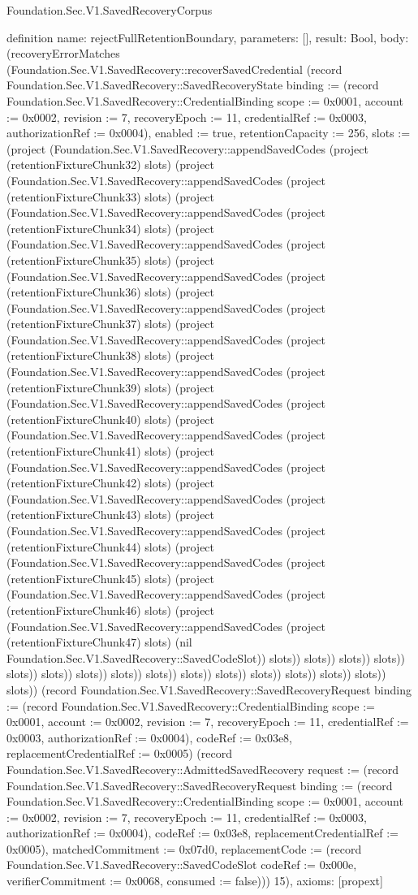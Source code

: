 \begin{lexlean}{Foundation.Sec.V1.SavedRecoveryCorpus}
\begin{semanticmodule}
definition{
  name: rejectFullRetentionBoundary,
  parameters: [],
  result: Bool,
  body: (recoveryErrorMatches (Foundation.Sec.V1.SavedRecovery::recoverSavedCredential (record Foundation.Sec.V1.SavedRecovery::SavedRecoveryState {binding := (record Foundation.Sec.V1.SavedRecovery::CredentialBinding {scope := 0x0001, account := 0x0002, revision := 7, recoveryEpoch := 11, credentialRef := 0x0003, authorizationRef := 0x0004}), enabled := true, retentionCapacity := 256, slots := (project (Foundation.Sec.V1.SavedRecovery::appendSavedCodes (project (retentionFixtureChunk32) slots) (project (Foundation.Sec.V1.SavedRecovery::appendSavedCodes (project (retentionFixtureChunk33) slots) (project (Foundation.Sec.V1.SavedRecovery::appendSavedCodes (project (retentionFixtureChunk34) slots) (project (Foundation.Sec.V1.SavedRecovery::appendSavedCodes (project (retentionFixtureChunk35) slots) (project (Foundation.Sec.V1.SavedRecovery::appendSavedCodes (project (retentionFixtureChunk36) slots) (project (Foundation.Sec.V1.SavedRecovery::appendSavedCodes (project (retentionFixtureChunk37) slots) (project (Foundation.Sec.V1.SavedRecovery::appendSavedCodes (project (retentionFixtureChunk38) slots) (project (Foundation.Sec.V1.SavedRecovery::appendSavedCodes (project (retentionFixtureChunk39) slots) (project (Foundation.Sec.V1.SavedRecovery::appendSavedCodes (project (retentionFixtureChunk40) slots) (project (Foundation.Sec.V1.SavedRecovery::appendSavedCodes (project (retentionFixtureChunk41) slots) (project (Foundation.Sec.V1.SavedRecovery::appendSavedCodes (project (retentionFixtureChunk42) slots) (project (Foundation.Sec.V1.SavedRecovery::appendSavedCodes (project (retentionFixtureChunk43) slots) (project (Foundation.Sec.V1.SavedRecovery::appendSavedCodes (project (retentionFixtureChunk44) slots) (project (Foundation.Sec.V1.SavedRecovery::appendSavedCodes (project (retentionFixtureChunk45) slots) (project (Foundation.Sec.V1.SavedRecovery::appendSavedCodes (project (retentionFixtureChunk46) slots) (project (Foundation.Sec.V1.SavedRecovery::appendSavedCodes (project (retentionFixtureChunk47) slots) (nil Foundation.Sec.V1.SavedRecovery::SavedCodeSlot)) slots)) slots)) slots)) slots)) slots)) slots)) slots)) slots)) slots)) slots)) slots)) slots)) slots)) slots)) slots)) slots)}) (record Foundation.Sec.V1.SavedRecovery::SavedRecoveryRequest {binding := (record Foundation.Sec.V1.SavedRecovery::CredentialBinding {scope := 0x0001, account := 0x0002, revision := 7, recoveryEpoch := 11, credentialRef := 0x0003, authorizationRef := 0x0004}), codeRef := 0x03e8, replacementCredentialRef := 0x0005}) (record Foundation.Sec.V1.SavedRecovery::AdmittedSavedRecovery {request := (record Foundation.Sec.V1.SavedRecovery::SavedRecoveryRequest {binding := (record Foundation.Sec.V1.SavedRecovery::CredentialBinding {scope := 0x0001, account := 0x0002, revision := 7, recoveryEpoch := 11, credentialRef := 0x0003, authorizationRef := 0x0004}), codeRef := 0x03e8, replacementCredentialRef := 0x0005}), matchedCommitment := 0x07d0, replacementCode := (record Foundation.Sec.V1.SavedRecovery::SavedCodeSlot {codeRef := 0x000e, verifierCommitment := 0x0068, consumed := false})})) 15),
  axioms: [propext]
}


\end{semanticmodule}
\end{lexlean}
